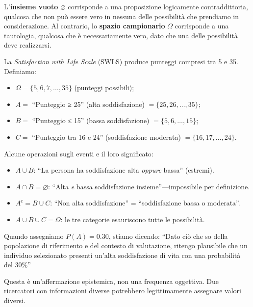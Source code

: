 \documentclass[
  italian,
  letterpaper,
  a4paper,
  11pt,
  open=any]{scrbook}
\providecommand{\tightlist}{%
  \setlength{\itemsep}{0pt}\setlength{\parskip}{0pt}}
\theoremstyle{plain}
\theoremstyle{definition}
\theoremstyle{definition}
\theoremstyle{remark}
\begin{document}
L'\textbf{insieme vuoto} \(\varnothing\) corrisponde a una proposizione
logicamente contraddittoria, qualcosa che non può essere vero in nessuna
delle possibilità che prendiamo in considerazione. Al contrario, lo
\textbf{spazio campionario} \(\Omega\) corrisponde a una tautologia,
qualcosa che è necessariamente vero, dato che una delle possibilità deve
realizzarsi.

\begin{tcolorbox}[enhanced jigsaw, arc=.35mm, bottomrule=.15mm, bottomtitle=1mm, breakable, colback=white, colbacktitle=quarto-callout-note-color!10!white, colframe=quarto-callout-note-color-frame, coltitle=black, left=2mm, leftrule=.75mm, opacityback=0, opacitybacktitle=0.6, rightrule=.15mm, title=\textcolor{quarto-callout-note-color}{\faInfo}\hspace{0.5em}{Esempio: Eventi in un test psicometrico}, titlerule=0mm, toprule=.15mm, toptitle=1mm]

La \emph{Satisfaction with Life Scale} (SWLS) produce punteggi compresi
tra 5 e 35. Definiamo:

\begin{itemize}
\tightlist
\item
  \(\Omega = \{5, 6, 7, \ldots, 35\}\) (punteggi possibili);
\item
  \(A =\) ``Punteggio ≥ 25'' (alta soddisfazione)
  \(= \{25, 26, \ldots, 35\}\);
\item
  \(B =\) ``Punteggio ≤ 15'' (bassa soddisfazione)
  \(= \{5, 6, \ldots, 15\}\);
\item
  \(C =\) ``Punteggio tra 16 e 24'' (soddisfazione moderata)
  \(= \{16, 17, \ldots, 24\}\).
\end{itemize}

Alcune operazioni sugli eventi e il loro significato:

\begin{itemize}
\tightlist
\item
  \(A \cup B\): ``La persona ha soddisfazione alta \emph{oppure} bassa''
  (estremi).
\item
  \(A \cap B = \varnothing\): ``Alta \emph{e} bassa soddisfazione
  insieme''---impossibile per definizione.
\item
  \(A^c = B \cup C\): ``Non alta soddisfazione'' = ``soddisfazione bassa
  o moderata''.
\item
  \(A \cup B \cup C = \Omega\): le tre categorie esauriscono tutte le
  possibilità.
\end{itemize}

Quando assegniamo \(P(A) = 0.30\), stiamo dicendo: ``Dato ciò che so
della popolazione di riferimento e del contesto di valutazione, ritengo
plausibile che un individuo selezionato presenti un'alta soddisfazione
di vita con una probabilità del 30\%''

Questa è un'affermazione epistemica, non una frequenza oggettiva. Due
ricercatori con informazioni diverse potrebbero legittimamente assegnare
valori diversi.

\end{tcolorbox}
\end{document}
